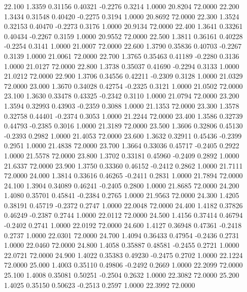   22.100   1.3359   0.31156   0.40321  -0.2276   0.3214   1.0000  20.8204  72.0000
  22.200   1.3434   0.31548   0.40420  -0.2275   0.3194   1.0000  20.8692  72.0000
  22.300   1.3524   0.32153   0.40470  -0.2273   0.3176   1.0000  20.9134  72.0000
  22.400   1.3641   0.33261   0.40434  -0.2267   0.3159   1.0000  20.9552  72.0000
  22.500   1.3811   0.36161   0.40228  -0.2254   0.3141   1.0000  21.0007  72.0000
  22.600   1.3790   0.35836   0.40703  -0.2267   0.3139   1.0000  21.0061  72.0000
  22.700   1.3765   0.35463   0.41189  -0.2280   0.3136   1.0000  21.0127  72.0000
  22.800   1.3738   0.35037   0.41690  -0.2294   0.3133   1.0000  21.0212  72.0000
  22.900   1.3706   0.34556   0.42211  -0.2309   0.3128   1.0000  21.0329  72.0000
  23.000   1.3670   0.34028   0.42754  -0.2325   0.3121   1.0000  21.0502  72.0000
  23.100   1.3630   0.33478   0.43325  -0.2342   0.3110   1.0000  21.0794  72.0000
  23.200   1.3594   0.32993   0.43903  -0.2359   0.3088   1.0000  21.1353  72.0000
  23.300   1.3578   0.32758   0.44401  -0.2374   0.3053   1.0000  21.2244  72.0000
  23.400   1.3586   0.32739   0.44793  -0.2385   0.3016   1.0000  21.3189  72.0000
  23.500   1.3606   0.32806   0.45130  -0.2393   0.2982   1.0000  21.4053  72.0000
  23.600   1.3632   0.32911   0.45436  -0.2399   0.2951   1.0000  21.4838  72.0000
  23.700   1.3664   0.33036   0.45717  -0.2405   0.2922   1.0000  21.5578  72.0000
  23.800   1.3702   0.33181   0.45960  -0.2409   0.2892   1.0000  21.6337  72.0000
  23.900   1.3750   0.33360   0.46152  -0.2412   0.2862   1.0000  21.7111  72.0000
  24.000   1.3814   0.33616   0.46265  -0.2411   0.2831   1.0000  21.7894  72.0000
  24.100   1.3904   0.34089   0.46241  -0.2405   0.2800   1.0000  21.8685  72.0000
  24.200   1.4080   0.35701   0.45841  -0.2384   0.2765   1.0000  21.9563  72.0000
  24.300   1.4205   0.38191   0.45719  -0.2372   0.2747   1.0000  22.0048  72.0000
  24.400   1.4182   0.37826   0.46249  -0.2387   0.2744   1.0000  22.0112  72.0000
  24.500   1.4156   0.37414   0.46794  -0.2402   0.2741   1.0000  22.0192  72.0000
  24.600   1.4127   0.36948   0.47361  -0.2418   0.2737   1.0000  22.0301  72.0000
  24.700   1.4094   0.36433   0.47954  -0.2436   0.2731   1.0000  22.0460  72.0000
  24.800   1.4058   0.35887   0.48581  -0.2455   0.2721   1.0000  22.0721  72.0000
  24.900   1.4022   0.35383   0.49230  -0.2475   0.2702   1.0000  22.1224  72.0000
  25.000   1.4003   0.35110   0.49806  -0.2492   0.2669   1.0000  22.2099  72.0000
  25.100   1.4008   0.35081   0.50251  -0.2504   0.2632   1.0000  22.3082  72.0000
  25.200   1.4025   0.35150   0.50623  -0.2513   0.2597   1.0000  22.3992  72.0000
